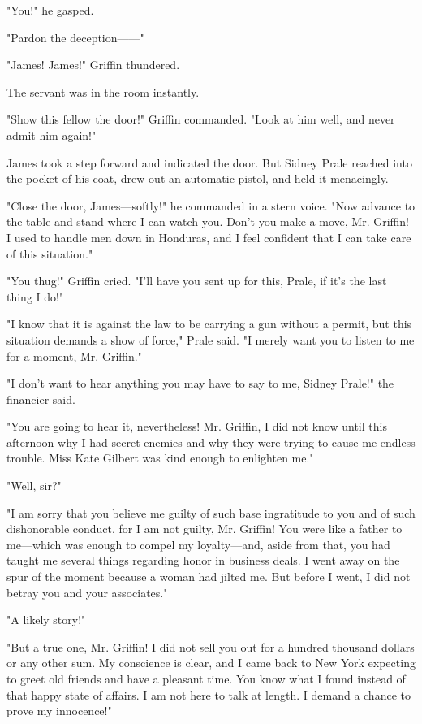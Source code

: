 \documentclass{novel}
\begin{document}
"You!" he gasped.

"Pardon the deception------"

"James! James!" Griffin thundered.

The servant was in the room instantly.

"Show this fellow the door!" Griffin commanded. "Look at him well, and never admit him again!"

James took a step forward and indicated the door. But Sidney Prale reached into the pocket of his coat, drew out an automatic pistol, and held it menacingly.

"Close the door, James---softly!" he commanded in a stern voice. "Now advance to the table and stand where I can watch you. Don't you make a move, Mr. Griffin! I used to handle men down in Honduras, and I feel confident that I can take care of this situation."

"You thug!" Griffin cried. "I'll have you sent up for this, Prale, if it's the last thing I do!"

"I know that it is against the law to be carrying a gun without a permit, but this situation demands a show of force," Prale said. "I merely want you to listen to me for a moment, Mr. Griffin."

"I don't want to hear anything you may have to say to me, Sidney Prale!" the financier said.

"You are going to hear it, nevertheless! Mr. Griffin, I did not know until this afternoon why I had secret enemies and why they were trying to cause me endless trouble. Miss Kate Gilbert was kind enough to enlighten me."

"Well, sir?"

"I am sorry that you believe me guilty of such base ingratitude to you and of such dishonorable conduct, for I am not guilty, Mr. Griffin! You were like a father to me---which was enough to compel my loyalty---and, aside from that, you had taught me several things regarding honor in business deals. I went away on the spur of the moment because a woman had jilted me. But before I went, I did not betray you and your associates."

"A likely story!"

"But a true one, Mr. Griffin! I did not sell you out for a hundred thousand dollars or any other sum. My conscience is clear, and I came back to New York expecting to greet old friends and have a pleasant time. You know what I found instead of that happy state of affairs. I am not here to talk at length. I demand a chance to prove my innocence!"
\end{document}
